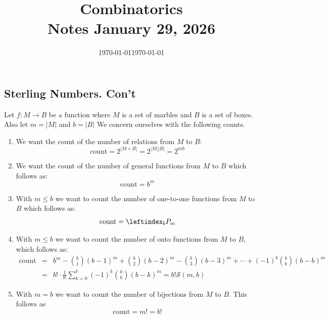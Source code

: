 \documentclass[12pt]{amsart}
\title{Combinatorics\\Notes January 29, 2026}
\date{\today}
\theoremstyle{definition}
\begin{document}
    \maketitle
    \date{\today}
    \begin{onehalfspace}
        \section{Sterling Numbers. Con't}
        Let $f:M\rightarrow B$ be a function where $M$ is a set of marbles and $B$ is a set of boxes.
        Also let $m = |M|$ and $b = |B|$
        We concern ourselves with the following counts.
        \begin{enumerate}
            \item We want the count of the number of relations from $M$ to $B$:
            \begin{displaymath}
                \text{count} = 2^{|M\times B|} = 2^{|M||B|} = 2^{mb}
            \end{displaymath}
            \item We want the count of the number of general functions from $M$ to $B$ which follows as:
            \begin{displaymath}
                \text{count} = b^m
            \end{displaymath}
            \item With $m\leq b$ we want to count the number of one-to-one functions from $M$ to $B$ which follows
            as:
            \begin{displaymath}
                \text{count} = \leftindex_b P_m
            \end{displaymath}
            \item With $m \leq b$ we want to count the number of onto functions from $M$ to $B$, which follows as:
            \begin{eqnarray*}
                \text{count} & = & b^m - \binom{b}{1}(b-1)^m + \binom{b}{2}(b-2)^m - \binom{b}{3}(b-3)^m + \cdots + (-1)^b\binom{b}{b}(b - b)^m \\
                & = & b! \cdot \frac{1}{b!} \sum_{k=0}^b (-1)^k\binom{b}{k}(b-k)^m = b!\mathcal{S}(m,b)
            \end{eqnarray*}
            \item With $m = b $ we want to count the number of bijections from $M$ to $B$. This follows as
            \begin{displaymath}
                \text{count} = m! = b!
            \end{displaymath}

\end{enumerate}
\end{onehalfspace}
\end{document}
